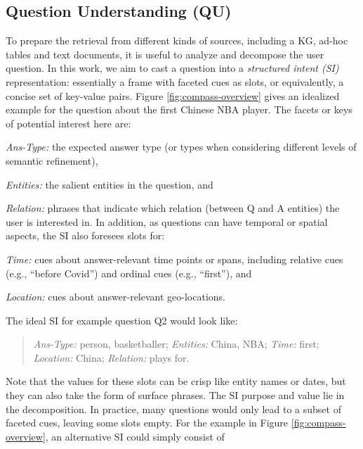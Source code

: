 \subsection{Question Understanding (QU)}

To prepare the retrieval from different kinds of sources, including a KG, ad-hoc tables and text documents, it is useful to analyze and decompose the user question.
In this work, we aim to cast a question into a 
{\em structured intent (SI)} representation: essentially
a frame with faceted cues as slots, or equivalently, a concise set of key-value pairs. 
Figure \ref{fig:compass-overview} gives an idealized example for the question about the first Chinese NBA player. The facets or keys of potential interest here 
are:
\squishlist
\item {\em Ans-Type:} the expected answer type (or types when considering
different levels of semantic refinement), 
\item {\em Entities:} the salient entities in the question, and 
\item {\em Relation:} phrases that indicate which relation (between Q and A entities) the user is interested in. 
\squishend
\noindent In addition, as questions can have temporal or spatial aspects, the SI also foresees slots for:
\squishlist
\item {\em Time:} cues about answer-relevant time points or spans, including relative cues (e.g., ``before Covid'') and ordinal cues (e.g., ``first''), and
\item {\em Location:} cues about answer-relevant geo-locations.
\squishend

\vspace{0.2cm}
\noindent The ideal SI for example question Q2 would look like:

\begin{quote}
{\em Ans-Type:} person, basketballer; {\em Entities:} China, NBA; {\em Time:} first;
{\em Location:} China; {\em Relation:} plays for.
\end{quote}

Note that the values for these slots can be crisp like entity names or dates, but they can also take the form of surface phrases. The SI purpose and value lie in the decomposition. In practice, many questions would only lead to a subset of faceted cues, leaving some slots empty. For the example in Figure \ref{fig:compass-overview}, an alternative SI could simply consist of

